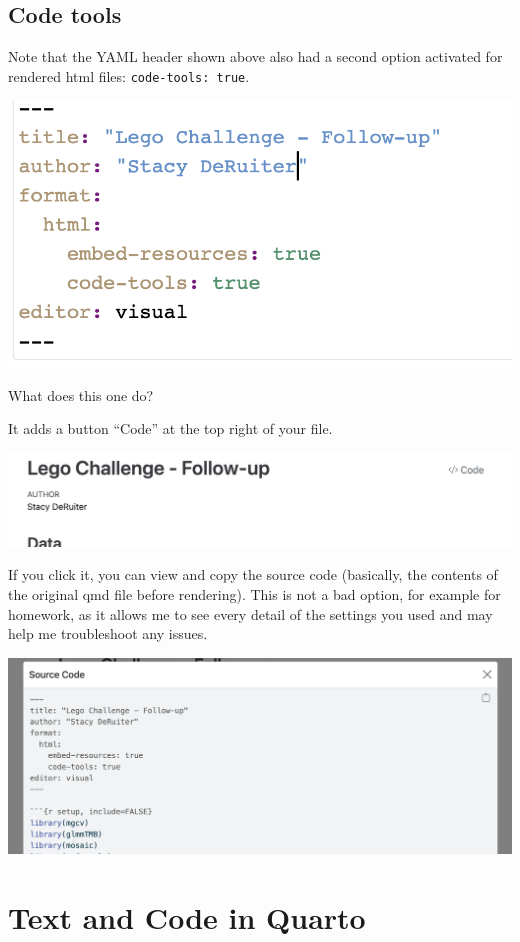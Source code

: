 \documentclass[
  letterpaper,
  DIV=11,
  numbers=noendperiod]{scrreprt}
\theoremstyle{remark}
\begin{document}
\subsection{Code tools}\label{code-tools}

Note that the YAML header shown above also had a second option activated
for rendered html files: \texttt{code-tools:\ true}.

\includegraphics[width=0.75\linewidth,height=\textheight,keepaspectratio]{images/embed.png}

What does this one do?

It adds a button ``Code'' at the top right of your file.

\includegraphics[width=0.75\linewidth,height=\textheight,keepaspectratio]{images/code-tools-button.png}

If you click it, you can view and copy the source code (basically, the
contents of the original qmd file before rendering). This is not a bad
option, for example for homework, as it allows me to see every detail of
the settings you used and may help me troubleshoot any issues.

\includegraphics[width=0.75\linewidth,height=\textheight,keepaspectratio]{images/code-tools-copy.png}

\section{Text and Code in Quarto}\label{text-and-code-in-quarto}
\end{document}
